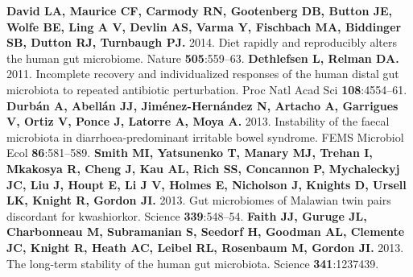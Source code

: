 \documentclass[12pt,oneside,letterpaper]{article}
\begin{document}
\clearpage

\begin{thebibliography}{9}
 {\bf David LA, Maurice CF, Carmody RN, Gootenberg DB, Button JE, Wolfe BE, Ling A V, Devlin AS, Varma Y, Fischbach MA, Biddinger SB, Dutton RJ, Turnbaugh PJ.} 2014. Diet rapidly and reproducibly alters the human gut microbiome. Nature {\bf 505}:559–63.
 {\bf Dethlefsen L, Relman DA.} 2011. Incomplete recovery and individualized responses of the human distal gut microbiota to repeated antibiotic perturbation. Proc Natl Acad Sci {\bf108}:4554–61.
 {\bf Durbán A, Abellán JJ, Jiménez-Hernández N, Artacho A, Garrigues V, Ortiz V, Ponce J, Latorre A, Moya A.} 2013. Instability of the faecal microbiota in diarrhoea-predominant irritable bowel syndrome. FEMS Microbiol Ecol {\bf 86}:581–589.
 {\bf Smith MI, Yatsunenko T, Manary MJ, Trehan I, Mkakosya R, Cheng J, Kau AL, Rich SS, Concannon P, Mychaleckyj JC, Liu J, Houpt E, Li J V, Holmes E, Nicholson J, Knights D, Ursell LK, Knight R, Gordon JI.} 2013. Gut microbiomes of Malawian twin pairs discordant for kwashiorkor. Science {\bf 339}:548–54.
 {\bf Faith JJ, Guruge JL, Charbonneau M, Subramanian S, Seedorf H, Goodman AL, Clemente JC, Knight R, Heath AC, Leibel RL, Rosenbaum M, Gordon JI.} 2013. The long-term stability of the human gut microbiota. Science {\bf 341}:1237439.
\end{thebibliography}
\end{document}
